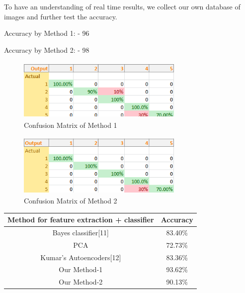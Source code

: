 \documentclass[conference]{IEEEtran}
\begin{document}
To have an understanding of real time results, we collect our own database of images and further test the accuracy.

Accuracy by Method 1: - 96%

Accuracy by Method 2: - 98%


\begin{figure}[h!]
	\centering
	\includegraphics[width = 8cm, height = 3cm]{cof2_1}
	\caption{Confusion Matrix of Method 1}
\end{figure}


\begin{figure}[h!]
	\centering
	\includegraphics[width = 8cm, height = 3cm]{cof2_2}
	\caption{Confusion Matrix of Method 2}
\end{figure}



\begin{center}
 \begin{tabular}{||c c||} 
 \hline
 Method for feature extraction + classifier & Accuracy  \\ [0.5ex] 
 \hline\hline
 Bayes classifier[11] & 83.40\%  \\ 
 \hline
 PCA & 72.73\% \\
 \hline
 Kumar's Autoencoders[12] & 83.36\% \\
 \hline
 Our Method-1 & 93.62\% \\
 \hline
 Our Method-2 & 90.13\% \\ [1ex] 
 \hline
\end{tabular}
\end{center}
\end{document}

